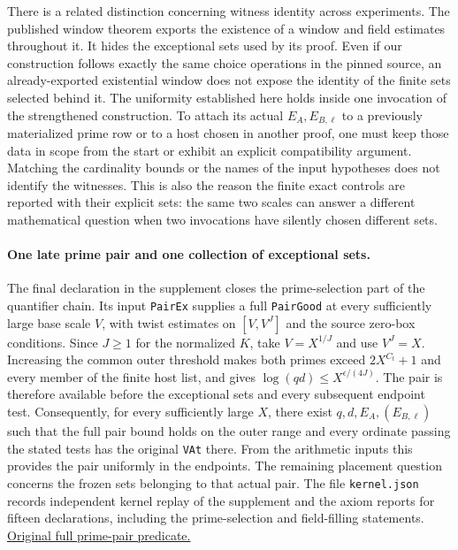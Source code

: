 \documentclass[12pt,letterpaper]{article}
\begin{document}
There is a related distinction concerning witness identity across experiments. The published window theorem exports the existence of a window and field estimates throughout it. It hides the exceptional sets used by its proof. Even if our construction follows exactly the same choice operations in the pinned source, an already-exported existential window does not expose the identity of the finite sets selected behind it. The uniformity established here holds inside one invocation of the strengthened construction. To attach its actual $E_A,E_{B,\ell}$ to a previously materialized prime row or to a host chosen in another proof, one must keep those data in scope from the start or exhibit an explicit compatibility argument. Matching the cardinality bounds or the names of the input hypotheses does not identify the witnesses. This is also the reason the finite exact controls are reported with their explicit sets: the same two scales can answer a different mathematical question when two invocations have silently chosen different sets.

\paragraph{One late prime pair and one collection of exceptional sets.}
The final declaration in the supplement closes the prime-selection part of the quantifier chain. Its input \texttt{PairEx} supplies a full \texttt{PairGood} at every sufficiently large base scale $V$, with twist estimates on $[V,V^J]$ and the source zero-box conditions. Since $J\geq1$ for the normalized $K$, take $V=X^{1/J}$ and use $V^J=X$. Increasing the common outer threshold makes both primes exceed $2X^{C_t}+1$ and every member of the finite host list, and gives $\log(qd)\leq X^{\epsilon/(4J)}$. The pair is therefore available before the exceptional sets and every subsequent endpoint test. Consequently, for every sufficiently large $X$, there exist $q,d,E_A,(E_{B,\ell})$ such that the full pair bound holds on the outer range and every ordinate passing the stated tests has the original \texttt{VAt} there. From the arithmetic inputs this provides the pair uniformly in the endpoints. The remaining placement question concerns the frozen sets belonging to that actual pair. The file \texttt{kernel.json} records independent kernel replay of the supplement and the axiom reports for fifteen declarations, including the prime-selection and field-filling statements. \href{https://github.com/nousentllc/riemann-hypothesis/blob/40e56bab026552e089d7afcfeff08d2defb9c005/src/Development/AutomorphicArithmetic/CharacterBoxes/PairGood.lean}{Original full prime-pair predicate.}
\end{document}
